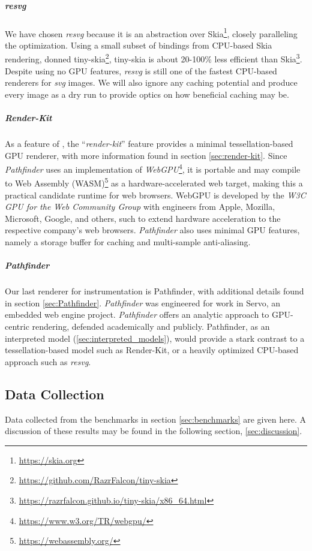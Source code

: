 \subparagraph{resvg} We have chosen \textit{resvg} because it is an abstraction over Skia\footnote{\href{https://skia.org}{https://skia.org}}, closely paralleling the optimization. Using a small subset of bindings from CPU-based Skia rendering, donned tiny-skia\footnote{\href{https://github.com/RazrFalcon/tiny-skia}{https://github.com/RazrFalcon/tiny-skia}}, tiny-skia is about 20-100\% less efficient than Skia\footnote{\href{https://razrfalcon.github.io/tiny-skia/x86_64.html}{https://razrfalcon.github.io/tiny-skia/x86\_64.html}}. Despite using no GPU features, \textit{resvg} is still one of the fastest CPU-based renderers for \textit{svg} images. We will also ignore any caching potential and produce every image as a dry run to provide optics on how beneficial caching may be.

\subparagraph{Render-Kit} As a feature of \toollinkedname, the ``\textit{render-kit}'' feature provides a minimal tessellation-based GPU renderer, with more information found in section \cref{sec:render-kit}. Since \textit{Pathfinder} uses an implementation of \textit{WebGPU}\footnote{\href{https://www.w3.org/TR/webgpu/}{https://www.w3.org/TR/webgpu/}}, it is portable and may compile to Web Assembly (WASM)\footnote{\href{https://webassembly.org/}{https://webassembly.org/}} as a hardware-accelerated web target, making this a practical candidate runtime for web browsers. WebGPU is developed by the \textit{W3C GPU for the Web Community Group} with engineers from Apple, Mozilla, Microsoft, Google, and others\cite{WebGPU}, such to extend hardware acceleration to the respective company's web browsers. \textit{Pathfinder} also uses minimal GPU features, namely a storage buffer for caching and multi-sample anti-aliasing.

\subparagraph{Pathfinder} Our last renderer for instrumentation is Pathfinder, with additional details found in section \cref{sec:Pathfinder}. \textit{Pathfinder} was engineered for work in Servo, an embedded web engine project. \textit{Pathfinder} offers an analytic approach to GPU-centric rendering, defended academically and publicly\cite{Walton18}. Pathfinder, as an interpreted model (\cref{sec:interpreted_models}), would provide a stark contrast to a tessellation-based model such as Render-Kit, or a heavily optimized CPU-based approach such as \textit{resvg}.

\subsection{Data Collection}
Data collected from the benchmarks in section \cref{sec:benchmarks} are given here. A discussion of these results may be found in the following section, \cref{sec:discussion}.

